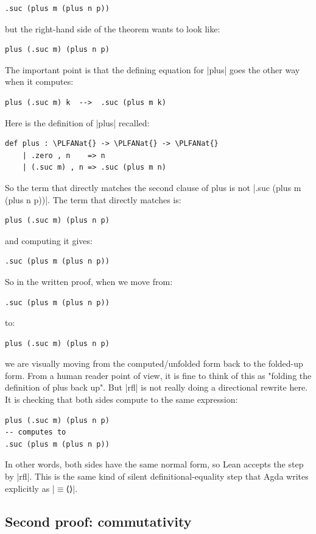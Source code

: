 \documentclass{memoir}
\newcommand{\PLFANat}{\ensuremath{\mathbb{N}}}
\newcommand{\PLFAEquiv}{\ensuremath{\equiv}}
\newcommand{\PLFASymbol}[1]{{\PLFASymbolFont #1}}
\begin{document}
\par
\par\noindent \begin{verbatim}
.suc (plus m (plus n p))
\end{verbatim}
but the right-hand side of the theorem wants to look like:\begin{verbatim}
plus (.suc m) (plus n p)
\end{verbatim}
The important point is that the defining equation for \LeanVerb|plus| goes the other
way when it computes:\begin{verbatim}
plus (.suc m) k  -->  .suc (plus m k)
\end{verbatim}
Here is the definition of \LeanVerb|plus| recalled:\begin{verbatim}
def plus : \PLFANat{} -> \PLFANat{} -> \PLFANat{}
    | .zero , n    => n
    | (.suc m) , n => .suc (plus m n)
\end{verbatim}
So the term that directly matches the second clause of plus is not
\LeanVerb|.suc (plus m (plus n p))|. The term that directly matches is:\begin{verbatim}
plus (.suc m) (plus n p)
\end{verbatim}
and computing it gives:\begin{verbatim}
.suc (plus m (plus n p))
\end{verbatim}
So in the written proof, when we move from:\begin{verbatim}
.suc (plus m (plus n p))
\end{verbatim}
to:\begin{verbatim}
plus (.suc m) (plus n p)
\end{verbatim}
we are visually moving from the computed/unfolded form back to the folded-up
form. From a human reader point of view, it is fine to think of this as
"folding the definition of plus back up". But \LeanVerb|rfl| is not really doing a
directional rewrite here. It is checking that both sides compute to the same
expression:\begin{verbatim}
plus (.suc m) (plus n p)
-- computes to
.suc (plus m (plus n p))
\end{verbatim}
In other words, both sides have the same normal form, so Lean accepts the step
by \LeanVerb|rfl|. This is the same kind of silent definitional-equality step that Agda
writes explicitly as \LeanVerb|\PLFAEquiv{}\PLFASymbol{⟨}\PLFASymbol{⟩}|.

\par

\subsection{Second proof: commutativity}\label{PLFA--in--Lean----Part--1----Induction-005F-005F-005F--Proof--by--Induction----Second--proof-005F-005F-005F--commutativity}
\end{document}
